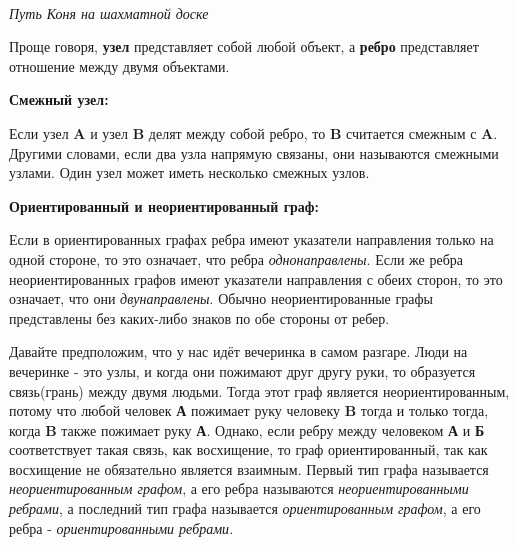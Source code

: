 
\begin{center}
     \\
    \textit{Путь Коня на шахматной доске}
\end{center}

Проще говоря, \textbf{узел} представляет собой любой объект, а \textbf{ребро} представляет отношение между двумя объектами.

\vspace{\baselineskip}

\textbf{Смежный узел:}

\vspace{\baselineskip}

Если узел \textbf{A} и узел \textbf{B} делят между собой ребро, то \textbf{B} считается смежным с \textbf{A}. Другими словами, если два узла напрямую связаны, они называются смежными узлами. Один узел может иметь несколько смежных узлов.

\vspace{\baselineskip}

\textbf{Ориентированный и неориентированный граф:}

\vspace{\baselineskip}

Если в ориентированных графах ребра имеют указатели направления только на одной стороне, то это означает, что ребра \textit{однонаправлены}. Если же ребра неориентированных графов имеют указатели направления с обеих сторон, то это означает, что они \textit{двунаправлены}. Обычно неориентированные графы представлены без каких-либо знаков по обе стороны от ребер.

\vspace{\baselineskip}

Давайте предположим, что у нас идёт вечеринка в самом разгаре. Люди на вечеринке - это узлы, и когда они пожимают друг другу руки, то образуется связь(грань) между двумя людьми. Тогда этот граф является неориентированным, потому что любой человек \textbf{А} пожимает руку человеку \textbf{B} тогда и только тогда, когда \textbf{B} также пожимает руку \textbf{А}. Однако, если ребру между человеком \textbf{А} и \textbf{Б} соответствует такая связь, как восхищение, то граф ориентированный, так как восхищение не обязательно является взаимным. Первый тип графа называется \textit{неориентированным графом}, а его ребра называются \textit{неориентированными ребрами}, а последний тип графа называется \textit{ориентированным графом}, а его ребра - \textit{ориентированными ребрами}.

